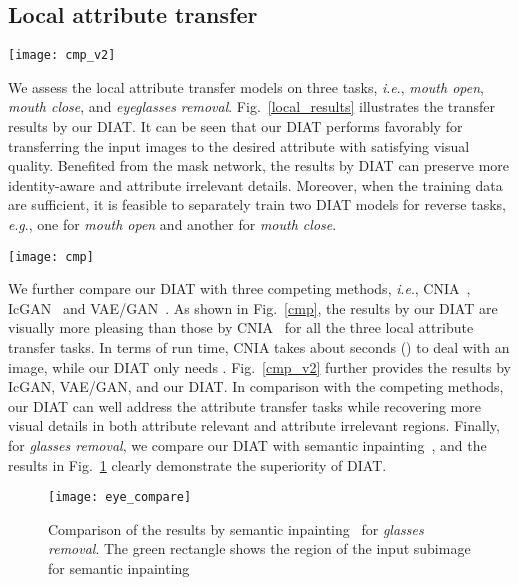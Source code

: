 \documentclass[journal]{IEEEtran}
\newcommand{\ie}{\textit{i}.\textit{e}.}
\newcommand{\eg}{\textit{e}.\textit{g}.}
\begin{document}
\subsection{Local attribute transfer}
\begin{figure*}
\begin{center}
\texttt{[image: cmp\_v2]}
\end{center}
   \caption{Comparison of transfer results by our DIAT, IcGAN~\cite{Perarnau2016} and VAE/GAN~\cite{larsen2015autoencoding}.}
\label{cmp_v2}
\end{figure*}

We assess the local attribute transfer models on three tasks, \ie, \emph{mouth open}, \emph{mouth close}, and \emph{eyeglasses removal}.
Fig.~\ref{local_results} illustrates the transfer results by our DIAT.
It can be seen that our DIAT performs favorably for transferring the input images to the desired attribute with satisfying visual quality.
Benefited from the mask network, the results by DIAT can preserve more identity-aware and attribute irrelevant details.
Moreover, when the training data are sufficient, it is feasible to separately train two DIAT models for reverse tasks, \eg, one for \emph{mouth open} and another for \emph{mouth close}.


\begin{figure*}
\begin{center}
\texttt{[image: cmp]}
\end{center}
   \caption{Comparison of transfer results by our DIAT and CNIA~\cite{li2016convolutional}.}
\label{cmp}
\end{figure*}

We further compare our DIAT with three competing methods, \ie, CNIA~\cite{li2016convolutional}, IcGAN~\cite{Perarnau2016} and VAE/GAN~\cite{larsen2015autoencoding}.
As shown in Fig.~\ref{cmp}, the results by our DIAT are visually more pleasing than those by CNIA~\cite{li2016convolutional} for all the three local attribute transfer tasks.
In terms of run time, CNIA takes about  seconds () to deal with an image, while our DIAT only needs  .
Fig.~\ref{cmp_v2} further provides the results by IcGAN, VAE/GAN, and our DIAT.
In comparison with the competing methods, our DIAT can well address the attribute transfer tasks while recovering more visual details in both attribute relevant and attribute irrelevant regions.
Finally, for \emph{glasses removal}, we compare our DIAT with semantic inpainting~\cite{yeh2016semantic}, and the results in Fig.~\ref{inpainting} clearly demonstrate the superiority of DIAT.
\begin{figure}[t]
\begin{center}
   \texttt{[image: eye\_compare]}
\end{center}
   \caption{Comparison of the results by semantic inpainting~\cite{yeh2016semantic} for \emph{glasses removal}. The green rectangle shows the region of the input subimage for semantic inpainting}
\label{inpainting}
\end{figure}
\end{document}
